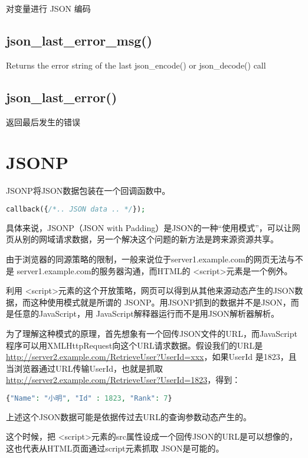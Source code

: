 对变量进行 JSON 编码

\section{json\_last\_error\_msg()}

Returns the error string of the last json\_encode() or json\_decode() call

\section{json\_last\_error()}

返回最后发生的错误

\chapter{JSONP}

JSONP将JSON数据包装在一个回调函数中。

\begin{lstlisting}[language=PHP]
callback({/*.. JSON data .. */});
\end{lstlisting}

具体来说，JSONP（JSON with Padding）是JSON的一种“使用模式”，可以让网页从别的网域请求数据，另一个解决这个问题的新方法是跨来源资源共享。


由于浏览器的同源策略的限制，一般来说位于server1.example.com的网页无法与不是 server1.example.com的服务器沟通，而HTML的 <script>元素是一个例外。

利用 <script>元素的这个开放策略，网页可以得到从其他来源动态产生的JSON数据，而这种使用模式就是所谓的 JSONP。用JSONP抓到的数据并不是JSON，而是任意的JavaScript，用 JavaScript解释器运行而不是用JSON解析器解析。

为了理解这种模式的原理，首先想象有一个回传JSON文件的URL，而JavaScript 程序可以用XMLHttpRequest向这个URL请求数据。假设我们的URL是\url{http://server2.example.com/RetrieveUser?UserId=xxx}，如果UserId 是1823，且当浏览器通过URL传输UserId，也就是抓取\url{http://server2.example.com/RetrieveUser?UserId=1823}，得到：

\begin{lstlisting}[language=PHP]
{"Name": "小明", "Id" : 1823, "Rank": 7}
\end{lstlisting}

上述这个JSON数据可能是依据传过去URL的查询参数动态产生的。

这个时候，把 <script>元素的src属性设成一个回传JSON的URL是可以想像的，这也代表从HTML页面通过script元素抓取 JSON是可能的。

